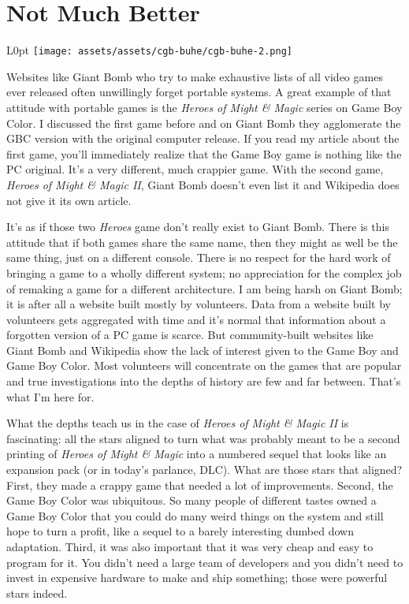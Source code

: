 \documentclass{book}
\begin{document}
\newpage\FloatBarrier\needspace{10mm}\section*{Not Much Better}\nopagebreak[4]
\begin{wrapfigure}{L}{0pt} \texttt{[image: assets/assets/cgb-buhe/cgb-buhe-2.png]}\end{wrapfigure}
Websites like Giant Bomb who try to make exhaustive lists of all video games ever released often unwillingly forget portable systems. A great example of that attitude with portable games is the \emph{Heroes of Might \& Magic} series on Game Boy Color. I discussed the first game before and on Giant Bomb they agglomerate the GBC version with the original computer release. If you read my article about the first game, you’ll immediately realize that the Game Boy game is nothing like the PC original. It’s a very different, much crappier game. With the second game, \emph{Heroes of Might \& Magic II}, Giant Bomb doesn’t even list it and Wikipedia does not give it its own article.

It’s as if those two \emph{Heroes} game don’t really exist to Giant Bomb. There is this attitude that if both games share the same name, then they might as well be the same thing, just on a different console. There is no respect for the hard work of bringing a game to a wholly different system; no appreciation for the complex job of remaking a game for a different architecture. I am being harsh on Giant Bomb; it is after all a website built mostly by volunteers. Data from a website built by volunteers gets aggregated with time and it’s normal that information about a forgotten version of a PC game is scarce. But community-built websites like Giant Bomb and Wikipedia show the lack of interest given to the Game Boy and Game Boy Color. Most volunteers will concentrate on the games that are popular and true investigations into the depths of history are few and far between. That’s what I’m here for.

What the depths teach us in the case of \emph{Heroes of Might \& Magic II} is fascinating: all the stars aligned to turn what was probably meant to be a second printing of \emph{Heroes of Might \& Magic} into a numbered sequel that looks like an expansion pack (or in today’s parlance, DLC). What are those stars that aligned? First, they made a crappy game that needed a lot of improvements. Second, the Game Boy Color was ubiquitous. So many people of different tastes owned a Game Boy Color that you could do many weird things on the system and still hope to turn a profit, like a sequel to a barely interesting dumbed down adaptation. Third, it was also important that it was very cheap and easy to program for it. You didn’t need a large team of developers and you didn’t need to invest in expensive hardware to make and ship something; those were powerful stars indeed.
\end{document}
